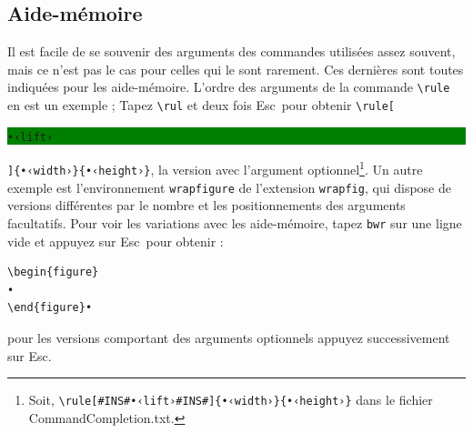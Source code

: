 \documentclass[11pt,french]{article}
\newcommand{\esckey}{\textsf{Esc}}
\newcommand{\selcomrule}{\colorbox{green}{\rule[-0.5ex]{0ex}{2.1ex}\texttt{•‹lift›}}}
\newcommand{\CCT}{\textsf{CommandCompletion.txt}}
\begin{document}
\subsection*{Aide-mémoire}

Il est facile de se souvenir des arguments des commandes utilisées assez souvent, mais ce n'est pas le cas pour 
celles qui le sont rarement. Ces dernières sont toutes indiquées pour les aide-mémoire. L'ordre des arguments de la 
commande \verb|\rule| en est un exemple ; Tapez \verb|\rul| et deux fois \esckey\ pour obtenir \verb|\rule[|\selcomrule\verb|]{•‹width›}{•‹height›}|, la version avec l'argument optionnel\footnote{Soit, \texttt{\textbackslash rule[\#INS\#•‹lift›\#INS\#]\{•‹width›\}\{•‹height›\}} dans le fichier \CCT.}. Un autre exemple est l'environnement \texttt{wrapfigure} de l'extension \texttt{wrapfig}, qui dispose de versions différentes par le nombre et les positionnements des arguments facultatifs. Pour voir les variations avec les aide-mémoire, tapez \texttt{bwr} sur une ligne vide et appuyez sur \esckey\ pour obtenir :
\begin{verbatim}
\begin{figure}
•
\end{figure}•
\end{verbatim}
pour les versions comportant des arguments optionnels appuyez successivement sur \esckey.


\end{document}
